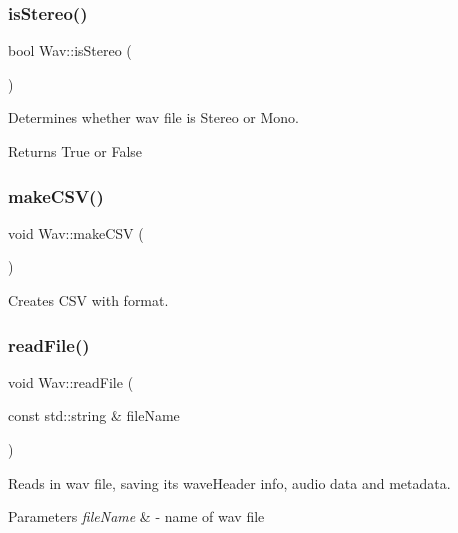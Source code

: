 \subsubsection{\texorpdfstring{is\+Stereo()}{isStereo()}}
{\footnotesize\ttfamily bool Wav\+::is\+Stereo (\begin{DoxyParamCaption}{ }\end{DoxyParamCaption})}

Determines whether wav file is Stereo or Mono. \begin{DoxyReturn}{Returns}
True or False 
\end{DoxyReturn}
\mbox{\label{classWav_ab2edefac96cd80a22875705ad2533e91}} 
\subsubsection{\texorpdfstring{make\+C\+S\+V()}{makeCSV()}}
{\footnotesize\ttfamily void Wav\+::make\+C\+SV (\begin{DoxyParamCaption}{ }\end{DoxyParamCaption})\hspace{0.3cm}{\ttfamily [static]}}

Creates C\+SV with format. \mbox{\label{classWav_a1c4230cec49d30147a5b8a1950083f7c}} 
\subsubsection{\texorpdfstring{read\+File()}{readFile()}}
{\footnotesize\ttfamily void Wav\+::read\+File (\begin{DoxyParamCaption}\item[{const std\+::string \&}]{file\+Name }\end{DoxyParamCaption})}

Reads in wav file, saving it\textquotesingle{}s wave\+Header info, audio data and metadata.


\begin{DoxyParams}{Parameters}
{\em file\+Name} & -\/ name of wav file \\
\hline
\end{DoxyParams}
\mbox{\label{classWav_a7bae34f37288c53cb113e76045f78098}} 
